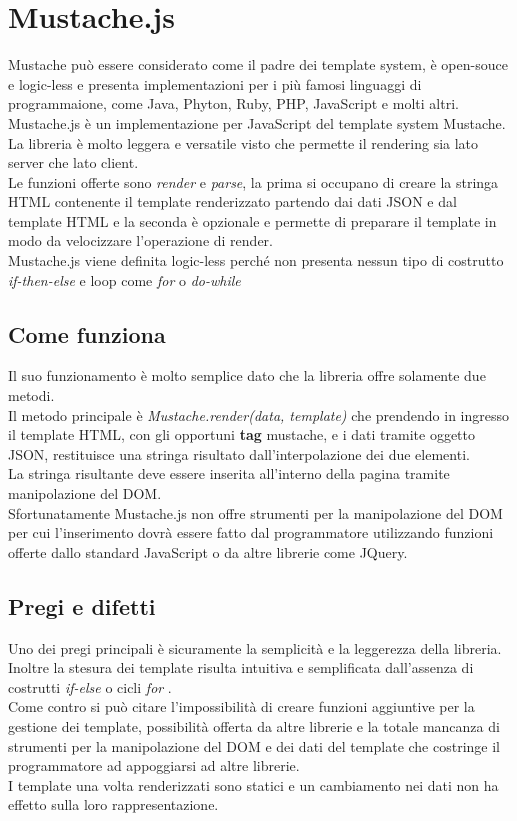 \section{Mustache.js}
Mustache può essere considerato come il padre dei template system, è open-souce e logic-less e presenta implementazioni per i più famosi linguaggi di programmaione, come Java, Phyton, Ruby, PHP, JavaScript e molti altri.\\
Mustache.js è un implementazione per JavaScript del template system Mustache.\\
La libreria è molto leggera e versatile visto che permette il rendering sia lato server che lato client.\\
Le funzioni offerte sono \textit{render} e \textit{parse}, la prima si occupano di creare la stringa HTML contenente il template renderizzato partendo dai dati JSON e dal template HTML e la seconda è opzionale e permette di preparare il template in modo da velocizzare l'operazione di render.\\
Mustache.js viene definita logic-less perché non presenta nessun tipo di costrutto \textit{if-then-else} e loop come \textit{for} o \textit{do-while}
\subsection{Come funziona}
Il suo funzionamento è molto semplice dato che la libreria offre solamente due metodi.\\
Il metodo principale è \textit{Mustache.render(data, template)} che prendendo in ingresso il template HTML, con gli opportuni \textbf{tag} mustache, e i dati tramite oggetto JSON, restituisce una stringa risultato dall'interpolazione dei due elementi.\\
La stringa risultante deve essere inserita all'interno della pagina tramite manipolazione del DOM.\\
Sfortunatamente Mustache.js non offre strumenti per la manipolazione del DOM per cui l'inserimento dovrà essere fatto dal programmatore utilizzando funzioni offerte dallo standard JavaScript o da altre librerie come JQuery.
\subsection{Pregi e difetti}
Uno dei pregi principali è sicuramente la semplicità e la leggerezza della libreria.\\
Inoltre la stesura dei template risulta intuitiva e semplificata dall'assenza di costrutti \textit{if-else} o cicli \textit{for} .\\
Come contro si può citare l'impossibilità di creare funzioni aggiuntive per la gestione dei template, possibilità offerta da altre librerie e la totale mancanza di strumenti per la manipolazione del DOM e dei dati del template che costringe il programmatore ad appoggiarsi ad altre librerie.\\
I template una volta renderizzati sono statici e un cambiamento nei dati non ha effetto sulla loro rappresentazione.

